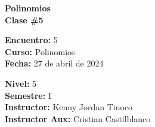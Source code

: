 \begin{center} \textbf
{
    \Large Polinomios \\ \vspace{2mm}Clase \#5
}
\end{center}

\begin{multicols}{2}
{
    \textbf{Encuentro:} 5\\
    \textbf{Curso:} Polinomios\\
    \textbf{Fecha:} 27 de abril de 2024\\
    \begin{flushright}
        \textbf{Nivel:} 5\\
        \textbf{Semestre:} I\\
        \textbf{Instructor:} Kenny Jordan Tinoco\\
        \textbf{Instructor Aux:} Cristian Castilblanco
    \end{flushright}
}
\end{multicols}

\thispagestyle{first-page-style}